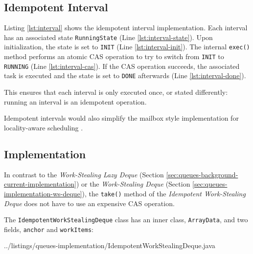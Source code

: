 \subsection{Idempotent Interval}
\label{sec:queues-implementation-idempotent-ws-deque-interval}

Listing \ref{lst:interval} shows the idempotent interval
implementation. Each interval has an associated state
\lstinline!RunningState! (Line \ref{lst:interval-state}). Upon
initialization, the state is set to \lstinline!INIT! (Line
\ref{lst:interval-init}). The internal \lstinline!exec()!  method
performs an atomic CAS operation to try to switch from
\lstinline!INIT! to \lstinline!RUNNING! (Line
\ref{lst:interval-cas}). If the CAS operation succeeds, the associated
task is executed and the state is set to \lstinline!DONE! afterwards
(Line \ref{lst:interval-done}).



This ensures that each interval is only executed once, or stated
differently: running an interval is an idempotent operation.

Idempotent intervals would also simplify the mailbox style
implementation for locality-aware scheduling \cite{Acar2000}.

\subsection{Implementation}
\label{sec:queues-implementation-idempotent-ws-deque-implementation}

In contrast to the \emph{Work-Stealing Lazy Deque} (Section
\ref{sec:queues-background-current-implementation}) or the
\emph{Work-Stealing Deque} (Section
\ref{sec:queues-implementation-ws-deque}), the \lstinline!take()!
method of the \emph{Idempotent Work-Stealing Deque} does not have to
use an expensive CAS operation.

The \lstinline!IdempotentWorkStealingDeque! class has an inner class,
\lstinline!ArrayData!, and two fields, \lstinline!anchor! and
\lstinline!workItems!:


{
    ../listings/queues-implementation/IdempotentWorkStealingDeque.java
}

